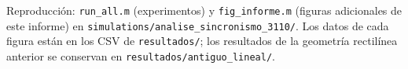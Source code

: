 \documentclass[11pt,a4paper]{article}
\begin{document}
\vspace{1em}
\noindent\small\sloppy Reproducción: \texttt{run\_all.m} (experimentos) y
\texttt{fig\_informe.m} (figuras adicionales de este informe) en
\texttt{simulations/analise\_sincronismo\_3110/}. Los datos de cada figura
están en los CSV de \texttt{resultados/}; los resultados de la geometría
rectilínea anterior se conservan en \texttt{resultados/antiguo\_lineal/}.
\end{document}
